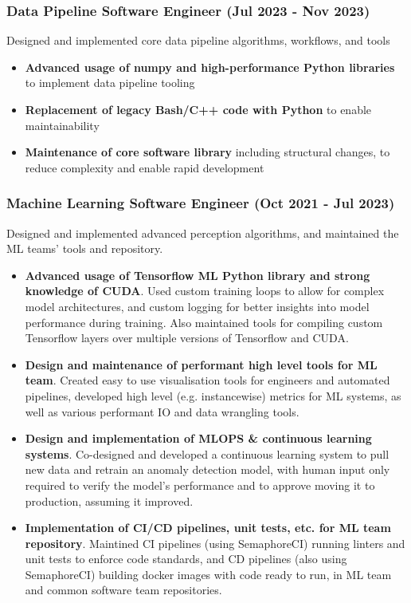\documentclass[12pt]{article}
\begin{document}
\begin{FlushLeft}
  \subsubsection{Data Pipeline Software Engineer (Jul 2023 - Nov 2023)}
  Designed and implemented core data pipeline algorithms, workflows, and tools \\

  \begin{itemize}
  \item \textbf{Advanced usage of numpy and high-performance Python libraries} to implement data pipeline tooling \\
  \item \textbf{Replacement of legacy Bash/C++ code with Python} to enable maintainability \\
  \item \textbf{Maintenance of core software library} including structural changes, to reduce complexity and enable rapid development \\
  \end{itemize}

  \subsubsection{Machine Learning Software Engineer (Oct 2021 - Jul 2023)}
  Designed and implemented advanced perception algorithms, and maintained the ML teams' tools and repository. \\

  \begin{itemize}
  \item \textbf{Advanced usage of Tensorflow ML Python library and strong knowledge of CUDA}. Used custom training loops to allow for complex model architectures, and custom logging for better insights into model performance during training. Also maintained tools for compiling custom Tensorflow layers over multiple versions of Tensorflow and CUDA. \\
  \item \textbf{Design and maintenance of performant high level tools for ML team}. Created easy to use visualisation tools for engineers and automated pipelines, developed high level (e.g. instancewise) metrics for ML systems, as well as various performant IO and data wrangling tools. \\
  \item \textbf{Design and implementation of MLOPS \& continuous learning systems}. Co-designed and developed a continuous learning system to pull new data and retrain an anomaly detection model, with human input only required to verify the model's performance and to approve moving it to production, assuming it improved.
  \item \textbf{Implementation of CI/CD pipelines, unit tests, etc. for ML team repository}. Maintined CI pipelines (using SemaphoreCI) running linters and unit tests to enforce code standards, and CD pipelines (also using SemaphoreCI) building docker images with code ready to run, in ML team and common software team repositories.
  \end{itemize}


\end{FlushLeft}
\end{document}
